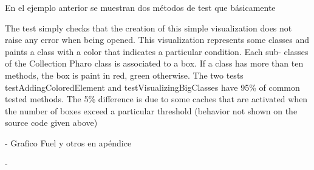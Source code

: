 \par En el ejemplo anterior se muestran dos métodos de test que básicamente


The test simply checks that the creation of this simple visualization does not raise any error when being opened.
This visualization represents some classes and paints a class with a color that indicates a particular condition. Each sub- classes of the Collection Pharo class is associated to a box. If a class has more than ten methods, the box is paint in red, green otherwise. The two tests testAddingColoredElement and testVisualizingBigClasses have 95\% of common tested methods. The 5\% difference is due to some caches that are activated when the number of boxes exceed a particular threshold (behavior not shown on the source code given above)


- Grafico Fuel y otros en apéndice

- 